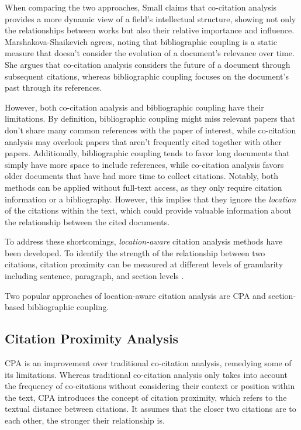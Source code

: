 When comparing the two approaches, Small \cite{SmallCocitationScientific1973} claims that co-citation analysis provides a more dynamic view of a field's intellectual structure, showing not only the relationships between works but also their relative importance and influence. Marshakova-Shaikevich \cite{Marshakova-ShaikevichSystemDocument1973} agrees, noting that bibliographic coupling is a static measure that doesn't consider the evolution of a document's relevance over time. She argues that co-citation analysis considers the future of a document through subsequent citations, whereas bibliographic coupling focuses on the document's past through its references.

However, both co-citation analysis and bibliographic coupling have their limitations. By definition, bibliographic coupling might miss relevant papers that don't share many common references with the paper of interest, while co-citation analysis may overlook papers that aren't frequently cited together with other papers. Additionally, bibliographic coupling tends to favor long documents that simply have more space to include references, while co-citation analysis favors older documents that have had more time to collect citations. Notably, both methods can be applied without full-text access, as they only require citation information or a bibliography. However, this implies that they ignore the \emph{location} of the citations within the text, which could provide valuable information about the relationship between the cited documents.

To address these shortcomings, \emph{location-aware} citation analysis methods have been developed. To identify the strength of the relationship between two citations, citation proximity can be measured at different levels of granularity including sentence, paragraph, and section levels \cite{TranEnrichingPubMed2009,LiuEffectsCocitation2011}.

Two popular approaches of location-aware citation analysis are \acl{CPA} and section-based bibliographic coupling.


\subsection{Citation Proximity Analysis} \label{sec:citation-proximity-analysis}

\ac{CPA} \cite{GippCitationProximity2009} is an improvement over traditional co-citation analysis, remedying some of its limitations. Whereas traditional co-citation analysis only takes into account the frequency of co-citations without considering their context or position within the text, \ac{CPA} introduces the concept of citation proximity, which refers to the textual distance between citations. It assumes that the closer two citations are to each other, the stronger their relationship is.

